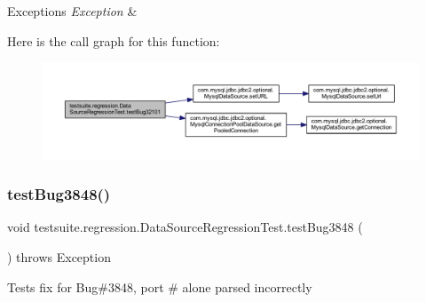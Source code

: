 \begin{DoxyExceptions}{Exceptions}
{\em Exception} & \\
\hline
\end{DoxyExceptions}
Here is the call graph for this function\+:
\nopagebreak
\begin{figure}[H]
\begin{center}
\leavevmode
\includegraphics[width=350pt]{classtestsuite_1_1regression_1_1_data_source_regression_test_afbc8307057c46d97d66b67f78f567cb5_cgraph}
\end{center}
\end{figure}
\mbox{\label{classtestsuite_1_1regression_1_1_data_source_regression_test_a8996aec86e7e81696fa451b9d9b457f2}} 
\subsubsection{\texorpdfstring{test\+Bug3848()}{testBug3848()}}
{\footnotesize\ttfamily void testsuite.\+regression.\+Data\+Source\+Regression\+Test.\+test\+Bug3848 (\begin{DoxyParamCaption}{ }\end{DoxyParamCaption}) throws Exception}

Tests fix for Bug\#3848, port \# alone parsed incorrectly


